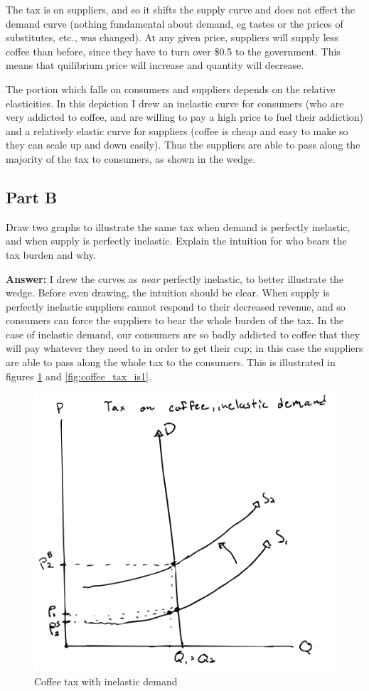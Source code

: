\documentclass[12pt]{article}
\begin{document}
The tax is on suppliers, and so it shifts the supply curve and does not effect the demand curve (nothing fundamental about demand, eg tastes or the prices of substitutes, etc., was changed). At any given price, suppliers will supply less coffee than before, since they have to turn over \$0.5 to the government. This means that quilibrium price will increase and quantity will decrease.

\vspace{2mm}

The portion which falls on consumers and suppliers depends on the relative elasticities. In this depiction I drew an inelastic curve for consumers (who are very addicted to coffee, and are willing to pay a high price to fuel their addiction) and a relatively elastic curve for suppliers (coffee is cheap and easy to make so they can scale up and down easily). Thus the suppliers are able to pass along the majority of the tax to consumers, as shown in the wedge.

\vspace{2mm}

\subsection*{Part B}
Draw two graphs to illustrate the same tax when demand is perfectly inelastic, and when supply is perfectly inelastic. Explain the intuition for who bears the tax burden and why.

\textbf{Answer:}
I drew the curves as \textit{near} perfectly inelastic, to better illustrate the wedge. Before even drawing, the intuition should be clear. When supply is perfectly inelastic suppliers cannot respond to their decreased revenue, and so consumers can force the suppliers to bear the whole burden of the tax. In the case of inelastic demand, our consumers are so badly addicted to coffee that they will pay whatever they need to in order to get their cup; in this case the suppliers are able to pass along the whole tax to the consumers. This is illustrated in figures \ref{fig:coffee_tax_id} and \ref{fig:coffee_tax_is1}.

\begin{figure}
    \centering
    \includegraphics[width=.6\textwidth]{coffee_tax_id.png}
    \caption{Coffee tax with inelastic demand}
    \label{fig:coffee_tax_id}
\end{figure}
\end{document}
